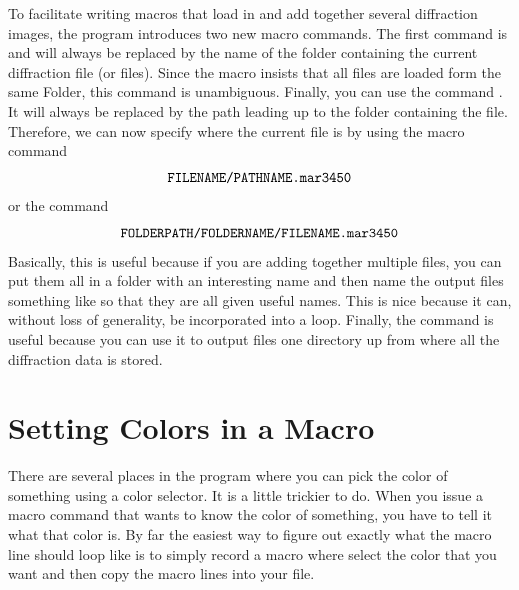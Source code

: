 To facilitate writing macros that load in and 
add together several diffraction images, the program
introduces two new macro commands. The first command is
 and will always be replaced
by the name of the folder containing the current
diffraction file (or files). Since the macro insists 
that all files are loaded form the same Folder, this
command is unambiguous. Finally, you can use the 
command . It will always be 
replaced by the path leading up to the folder 
containing the file. Therefore, we can now specify 
where the current file is by using the macro command
\begin{equation*}
    \text{{\tt FILENAME/PATHNAME.mar3450}}
\end{equation*}
or the command
\begin{equation*}
    \text{{\tt FOLDERPATH/FOLDERNAME/FILENAME.mar3450}}
\end{equation*}
Basically, this is useful because if you are adding
together multiple files, you can put them all in a
folder with an interesting name and then name 
the output files something like 
 so that they are all
given useful names. This is nice because it can, without
loss of generality, be incorporated into a loop. Finally,
the  command is useful because you
can use it to output files one directory up from where all
the diffraction data is stored.

\section{Setting Colors in a Macro}

There are several places in the program where you can
pick the color of something using a color selector.
It is a little trickier to do.  When you issue a macro 
command that wants to know the color of something, you 
have to tell it what that color is. By far the easiest
way to figure out exactly what the macro line should
loop like is to simply record a macro where select
the color that you want and then copy the macro lines
into your file.

